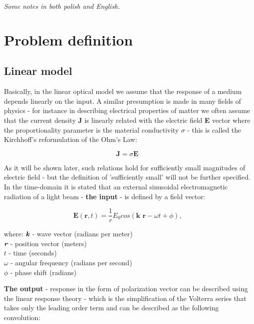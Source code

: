 \documentclass[12pt,twoside,a4paper]{article}
\numberwithin{equation}{subsection}
\numberwithin{figure}{subsection}
\begin{document}
\textit{Some notes in both polish and English.}

\section{Problem definition} \label{chap:problem}

\subsection{Linear model} \label{chap:problem_lin}

Basically, in the linear optical model we assume that the response of a medium depends linearly on the input. A similar presumption
is made in many fields of physics - for instance in describing electrical properties of matter we often assume that the current density
\textbf{J} is linearly related with the electric field \textbf{E} vector where the proportionality parameter is the material
conductivity $\sigma $ - this is called the Kirchhoff's reformulation of the Ohm's Law:

\begin{equation} \label{eq:ohms_law}
  \textbf{J} = \sigma \textbf{E}
\end{equation}

As it will be shown later, such relations hold for sufficiently small magnitudes of electric field - but the definition of
'sufficiently small' will not be further specified. In the time-domain it is stated that an external sinusoidal electromagnetic 
radiation of a light beam - \textbf{the input} - is defined by a field vector:

\begin{equation} \label{eq:electromagnetic_radiation}
  \textbf{E} (\textbf{r}, t) =  \frac{1}{r} {E_{0}} cos(\textbf{k r} - \omega t + \phi) \mbox{,}
\end{equation}

where:
$\textit{\textbf{k}}$ - wave vector (radians per meter) \\
$\textit{\textbf{r}}$ - position vector (meters) \\
$t$ - time (seconds) \\
$\omega $ - angular frequency (radians per second) \\
$\phi $ - phase shift (radians)

\textbf{The output} - response in the form of polarization vector can be described using the linear response theory - which is the
simplification of the Volterra series that takes only the leading order term and can be described as the following convolution:
\end{document}
